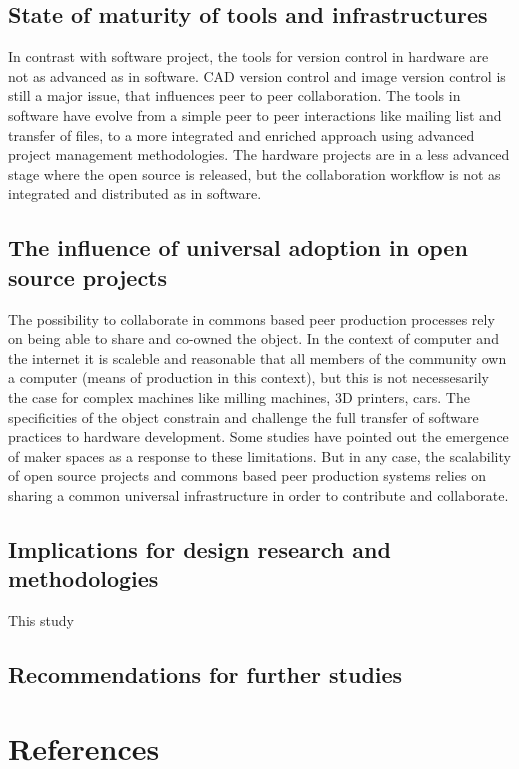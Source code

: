 \documentclass{ICED-Paper}%
\begin{document}
\subsection{State of maturity of tools and infrastructures}
In contrast with software project, the tools for version control in hardware are not as advanced as in software. CAD version control and image version control is still a major issue, that influences peer to peer collaboration. The tools in software have evolve from a simple peer to peer interactions like mailing list and transfer of files, to a more integrated and enriched approach using advanced project management methodologies. The hardware projects are in a less advanced stage where the open source is released, but the collaboration workflow is not as integrated and distributed as in software.
\subsection{The influence of universal adoption in open source projects}
The possibility to collaborate in commons based peer production processes rely on being able to share and co-owned the object. In the context of computer and the internet it is scaleble and reasonable that all members of the community own a computer (means of production in this context), but this  is not necessesarily the case for complex machines like milling machines, 3D printers, cars. The specificities of the object constrain and challenge the full transfer of software practices to hardware development. Some studies have pointed out the emergence of maker spaces as a response to these limitations. But in any case, the scalability of open source projects and commons based peer production systems relies on sharing a common universal infrastructure in order to contribute and collaborate.

\subsection{Implications for design research and methodologies}
This study


\subsection{Recommendations for further studies}

\section*{References}
\end{document}
